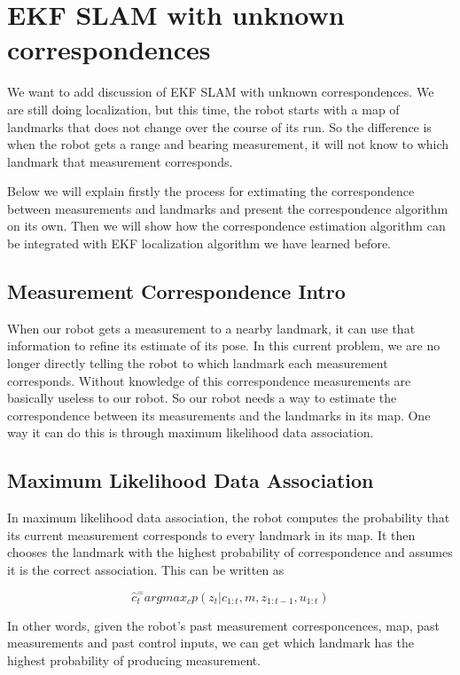 \documentclass[twoside]{article}
\begin{document}
\section {EKF SLAM with unknown correspondences}

We want to add discussion of EKF SLAM with unknown correspondences. We are still doing localization, but this time, the robot starts with a map of landmarks that does not change over the course of its run. So the difference is when the robot gets a range and bearing measurement, it will not know to which landmark that measurement corresponds.

Below we will explain firstly the process for extimating the correspondence between measurements and landmarks and present the correspondence algorithm on its own. Then we will show how the correspondence estimation algorithm can be integrated with EKF localization algorithm we have learned before.

\subsection {Measurement Correspondence Intro}

When our robot gets a measurement to a nearby landmark, it can use that information to refine its estimate of its pose. In this current problem, we are no longer directly telling the robot to which landmark each measurement corresponds. Without knowledge of this correspondence measurements are basically useless to our robot. So our robot needs a way to estimate the correspondence between its measurements and the landmarks in its map. One way it can do this is through maximum likelihood data association.

\subsection {Maximum Likelihood Data Association}

In maximum likelihood data association, the robot computes the probability that its current measurement corresponds to every landmark in its map. It then chooses the landmark with the highest probability of correspondence and assumes it is the correct association. This can be written as

\begin{equation}
\hat{c}_t^=argmax_{c}p(z_t|c_{1:t},m,z_{1:t-1},u_{1:t})
\end{equation}

In other words, given the robot's past measurement corresponcences, map, past measurements and past control inputs, we can get which landmark has the highest probability of producing measurement.
\end{document}
